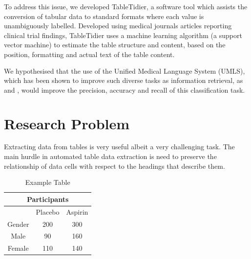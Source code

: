 \documentclass[10.7pt,]{article}
\begin{document}
To address this issue, we developed TableTidier, a software tool which assists the conversion of tabular data to standard formats where each value is unambiguously labelled. Developed using medical journals articles reporting clinical trial findings, TableTidier uses a machine learning algorithm (a support vector machine) to estimate the table structure and content, based on the position, formatting and actual text of the table content.

We hypothesised that the use of the Unified Medical Language System (UMLS), which has been shown to improve such diverse tasks as information retrieval, as \cite{umlsPRFretrieval} and \cite{gurulingappa2016semi}, would improve the precision, accuracy and recall of this classification task.




\section{Research Problem}\label{methods}
Extracting data from tables is very useful albeit a very challenging task. The main hurdle in automated table data extraction is need to preserve the relationship of data cells with respect to the headings that describe them.




\begin{table}[h!]
	\centering

\begin{tabular}{|c|c|c|}
	\hline 
	\multicolumn{3}{|c|}{Participants}  \\ 
	\hline 
	   & Placebo & Aspirin \\ 
	\hline 
Gender &200 & 300   \\ 
	\hline 
	 \hspace{1cm} Male & 90 & 160 \\ 
	\hline 
	 \hspace{1cm} Female & 110 & 140 \\ 
	\hline 
\end{tabular} 

	\caption{\label{tab:example} Example Table }
\end{table}
\end{document}
